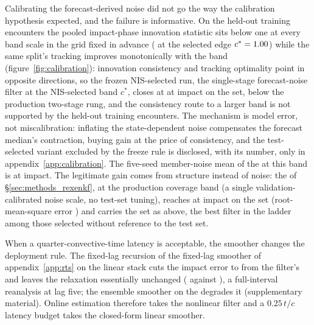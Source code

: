 Calibrating the forecast-derived noise did not go the way the calibration
hypothesis expected, and the failure is informative. On the held-out
training encounters the pooled impact-phase innovation statistic sits
below one at every band scale in the grid fixed in advance (\PoneNisAtCStar{}
at the selected edge $c^{*} = 1.00$) while the same split's
tracking improves monotonically with the band
(figure~\ref{fig:calibration}): innovation consistency and tracking
optimality point in opposite directions, so the frozen NIS-selected run, the
single-stage forecast-noise filter at the NIS-selected band $c^{*}$, closes at
\PoneFrozenRexImpact{} at impact on the \TestSplit{} set, below the
production two-stage rung, and the
consistency route to a larger band is not supported by the held-out
training encounters. The mechanism is model
error, not miscalibration: inflating the state-dependent noise compensates
the forecast median's contraction, buying gain at the price of
consistency, and the test-selected variant excluded by the freeze rule is
disclosed, with its number, only in appendix~\ref{app:calibration}. The
five-seed member-noise mean of the \FnoiseKF{} at this band is
\PoneRexEnkfImpact{} at impact. The legitimate gain comes from structure instead of noise: the
\TwoStageKF{} of \S\ref{sec:methods_rexenkf}, at the production coverage
band (a single validation-calibrated noise scale, no test-set tuning),
reaches \PoneTwoStageCovImpact{} at impact on
the \TestSplit{} set (root-mean-square error \PoneTwoStageCovRmse) and carries the
\BoundarySplit{} set as above, the best filter in the ladder among those selected without reference to
the test set.\re

When a quarter-convective-time latency is acceptable, the smoother
changes the deployment rule. The fixed-lag recursion of
the fixed-lag smoother of appendix~\ref{app:rts} on the linear stack cuts the impact error to
\SmRtsImpRmse{} from the filter's \SmKfImpRmse{} and leaves the relaxation
essentially unchanged (\SmRtsRelRmse{} against
\SmKfRelRmse), a full-interval reanalysis at lag five;
the ensemble smoother on the \FnoiseKF{} degrades it
(supplementary material). Online estimation therefore takes the
nonlinear filter and a $0.25\,t/c$ latency budget takes the closed-form
linear smoother.\re

